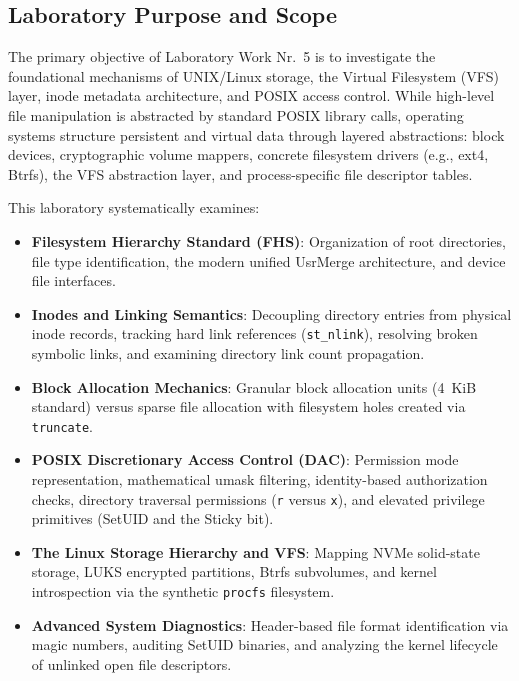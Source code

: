 \documentclass[12pt,a4paper]{article}
\begin{document}
\subsection{Laboratory Purpose and Scope}
The primary objective of Laboratory Work Nr.~5 is to investigate the foundational mechanisms of UNIX/Linux storage, the Virtual Filesystem (VFS) layer, inode metadata architecture, and POSIX access control. While high-level file manipulation is abstracted by standard POSIX library calls, operating systems structure persistent and virtual data through layered abstractions: block devices, cryptographic volume mappers, concrete filesystem drivers (e.g., ext4, Btrfs), the VFS abstraction layer, and process-specific file descriptor tables.

This laboratory systematically examines:
\begin{itemize}
    \item \textbf{Filesystem Hierarchy Standard (FHS)}: Organization of root directories, file type identification, the modern unified UsrMerge architecture, and device file interfaces.
    \item \textbf{Inodes and Linking Semantics}: Decoupling directory entries from physical inode records, tracking hard link references (\texttt{st\_nlink}), resolving broken symbolic links, and examining directory link count propagation.
    \item \textbf{Block Allocation Mechanics}: Granular block allocation units (4~KiB standard) versus sparse file allocation with filesystem holes created via \texttt{truncate}.
    \item \textbf{POSIX Discretionary Access Control (DAC)}: Permission mode representation, mathematical umask filtering, identity-based authorization checks, directory traversal permissions (\texttt{r} versus \texttt{x}), and elevated privilege primitives (SetUID and the Sticky bit).
    \item \textbf{The Linux Storage Hierarchy and VFS}: Mapping NVMe solid-state storage, LUKS encrypted partitions, Btrfs subvolumes, and kernel introspection via the synthetic \texttt{procfs} filesystem.
    \item \textbf{Advanced System Diagnostics}: Header-based file format identification via magic numbers, auditing SetUID binaries, and analyzing the kernel lifecycle of unlinked open file descriptors.
\end{itemize}
\end{document}
